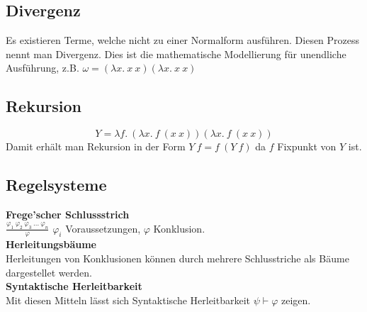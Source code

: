 \subsection{Divergenz}
Es existieren Terme, welche nicht zu einer Normalform ausführen. Diesen Prozess nennt man Divergenz.
Dies ist die mathematische Modellierung für unendliche Ausführung, z.B.
\(\omega = (\lambda x.\ x\ x)(\lambda x.\ x\ x)\)

\subsection{Rekursion}
\[Y = \lambda f.\ (\lambda x.\ f\ (x\ x))(\lambda x.\ f\ (x\ x))\]
Damit erhält man Rekursion in der Form \(Y\ f = f\ (Y\ f)\) da \(f\) Fixpunkt von \(Y\) ist.


\subsection{Regelsysteme}
\textbf{Frege'scher Schlussstrich}\\
\(\frac{\varphi_1\ \varphi_2\ \varphi_3\ \ldots\ \varphi_n}{\varphi}\) \(\varphi_i\) Voraussetzungen, \(\varphi\) Konklusion.\\
\textbf{Herleitungsbäume}\\
Herleitungen von Konklusionen können durch mehrere Schlusstriche als Bäume dargestellet werden.\\
\textbf{Syntaktische Herleitbarkeit}\\
Mit diesen Mitteln lässt sich Syntaktische Herleitbarkeit \(\psi \vdash \varphi\) zeigen.

